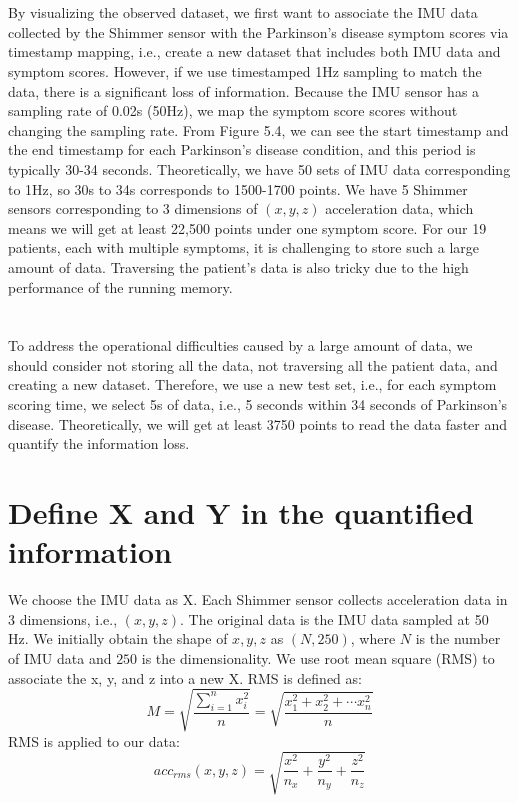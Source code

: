\\ \hspace*{\fill} \\
By visualizing the observed dataset, we first want to associate the IMU data collected by the Shimmer sensor with the Parkinson's disease symptom scores via timestamp mapping, i.e., create a new dataset that includes both IMU data and symptom scores. However, if we use timestamped 1Hz sampling to match the data, there is a significant loss of information. Because the IMU sensor has a sampling rate of 0.02s (50Hz), we map the symptom score scores without changing the sampling rate. From Figure 5.4, we can see the start timestamp and the end timestamp for each Parkinson's disease condition, and this period is typically 30-34 seconds. Theoretically, we have 50 sets of IMU data corresponding to 1Hz, so 30s to 34s corresponds to 1500-1700 points. We have 5 Shimmer sensors corresponding to 3 dimensions of $(x, y, z)$ acceleration data, which means we will get at least 22,500 points under one symptom score. For our 19 patients, each with multiple symptoms, it is challenging to store such a large amount of data. Traversing the patient's data is also tricky due to the high performance of the running memory. \\
\\ \hspace*{\fill} \\
To address the operational difficulties caused by a large amount of data, we should consider not storing all the data, not traversing all the patient data, and creating a new dataset. Therefore, we use a new test set, i.e., for each symptom scoring time, we select 5s of data, i.e., 5 seconds within 34 seconds of Parkinson's disease. Theoretically, we will get at least 3750 points to read the data faster and quantify the information loss.

\section{Define X and Y in the quantified information}
We choose the IMU data as X. Each Shimmer sensor collects acceleration data in 3 dimensions, i.e., $(x, y, z)$. The original data is the IMU data sampled at 50 Hz. We initially obtain the shape of $x, y, z$ as $(N,250)$, where $N$ is the number of IMU data and $250$ is the dimensionality. We use root mean square (RMS) to associate the x, y, and z into a new X. RMS is defined as:
\begin{equation}
M = \sqrt{\frac{ {\textstyle \sum_{i=1}^{n}x_{i}^{2}} }{n}} =\sqrt{\frac{x_{1}^{2} + x_{2}^{2}+\cdots x_{n}^{2} }{n} } 
\end{equation}
RMS is applied to our data:
\begin{equation}
acc_{rms}(x,y,z) = \sqrt{\frac{x^{2} }{n_{x}} + \frac{y^{2} }{n_{y}} + \frac{z^{2} }{n_{z}}} 
\end{equation}


